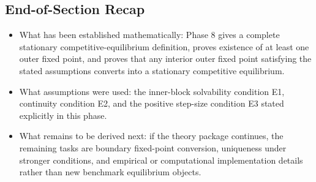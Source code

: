 \subsection*{End-of-Section Recap}

\begin{itemize}
    \item What has been established mathematically: Phase 8 gives a complete stationary competitive-equilibrium definition, proves existence of at least one outer fixed point, and proves that any interior outer fixed point satisfying the stated assumptions converts into a stationary competitive equilibrium.
    \item What assumptions were used: the inner-block solvability condition E1, continuity condition E2, and the positive step-size condition E3 stated explicitly in this phase.
    \item What remains to be derived next: if the theory package continues, the remaining tasks are boundary fixed-point conversion, uniqueness under stronger conditions, and empirical or computational implementation details rather than new benchmark equilibrium objects.
\end{itemize}
